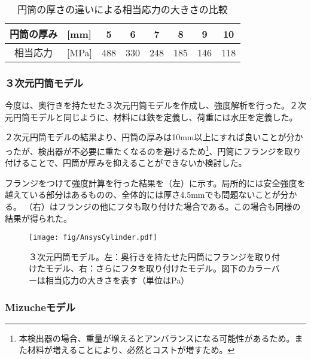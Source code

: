 \begin{table}[htbp]
\caption[円筒の厚さの違いによる相当応力の大きさの比較]{円筒の厚さの違いによる相当応力の大きさの比較}
\begin{center}
\begin{tabular}{clcccccc}
\hline \hline
円筒の厚み & [mm] & 5 & 6 & 7 & 8 & 9 & 10 \\
\hline
相当応力 & [MPa] & 488 & 330 & 248 & 185 & 146 & 118\\
\hline \hline
\end{tabular}
\end{center}
\label{Ansys2DResult}
\end{table}%


\subsubsection{３次元円筒モデル}
今度は、奥行きを持たせた３次元円筒モデルを作成し、強度解析を行った。２次元円筒モデルと同じように、材料には鉄を定義し、荷重には水圧を定義した。

２次元円筒モデルの結果より、円筒の厚みは10mm以上にすれば良いことが分かったが、検出器が不必要に重たくなるのを避けるため\footnote{本検出器の場合、重量が増えるとアンバランスになる可能性があるため。また材料が増えることにより、必然とコストが増すため。}、円筒にフランジを取り付けることで、円筒が厚みを抑えることができないか検討した。

フランジをつけて強度計算を行った結果を（左）に示す。局所的には安全強度を越えている部分はあるものの、全体的には厚さ4.5mmでも問題ないことが分かる。
（右）はフランジの他にフタも取り付けた場合である。この場合も同様の結果が得られた。

\begin{figure}[htbp]
\centering
\texttt{[image: fig/AnsysCylinder.pdf]}
\caption[３次元円筒モデル]{３次元円筒モデル。左：奥行きを持たせた円筒にフランジを取り付けたモデル、右：さらにフタを取り付けたモデル。図下のカラーバーは相当応力の大きさを表す（単位はPa）}
\label{AnsysCylinder}
\end{figure}

\subsubsection{Mizucheモデル}

